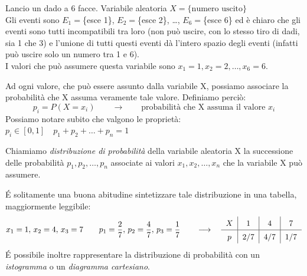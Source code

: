 \begin{esempio} Lancio un dado a 6 facce. Variabile aleatoria $X=\{\text{numero uscito}\}$\\[3pt]
Gli eventi sono $E_1 = $\{esce 1\}, $E_2 = $\{esce 2\}, \dots, $E_6 = $\{esce 6\} ed è chiaro che gli eventi sono tutti incompatibili tra loro (non può uscire, con lo stesso tiro di dadi, sia 1 che 3) e l'unione di tutti questi eventi dà l'intero spazio degli eventi (infatti può uscire solo un numero tra 1 e 6). \\I valori che può assumere questa variabile sono $x_1=1, x_2=2, \dots, x_6=6$.
\end{esempio}

Ad ogni valore, che può essere assunto dalla variabile X, possiamo associare la probabilità che X assuma veramente tale valore. Definiamo perciò:
\[\boxed{p_i = P(X=x_i)} \qquad \longrightarrow \qquad \text{probabilità che X assuma il valore $x_i$}\]
Possiamo notare subito che valgono le proprietà: \qquad\(\boxed{p_i \in [0,1]} \quad \boxed{p_1+p_2+\dots+p_n=1}\) 

\begin{definizione}Chiamiamo \emph{distribuzione di probabilità} della variabile aleatoria X la successione delle probabilità $p_1,p_2,\dots,p_n$ associate ai valori $x_1,x_2,\dots,x_n$ che la variabile X può assumere. 
\end{definizione}

\'E solitamente una buona abitudine sintetizzare tale distribuzione in una tabella, maggiormente leggibile:
\[x_1=1,\, x_2=4,\, x_3 = 7 \qquad p_1=\dfrac{2}{7},\, p_2 = \dfrac{4}{7},\, p_3 = \dfrac{1}{7} \qquad \longrightarrow \quad 
\renewcommand\arraystretch{1.4}
\setlength\arraycolsep{25pt}
\begin{tabular}{c|c|c|c}
$X$ & 1 & 4 & 7\\
\hline
$p$ & 2/7 & 4/7 & 1/7\\
\end{tabular}\]
\'E possibile inoltre rappresentare la distribuzione di probabilità con un \emph{istogramma} o un \emph{diagramma cartesiano}.

